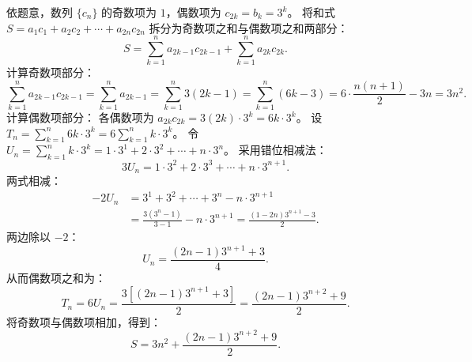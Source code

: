 \begin{answer}
依题意，数列 $\{c_n\}$ 的奇数项为 $1$，偶数项为 $c_{2k} = b_k = 3^k$。
将和式 $S = a_1 c_1 + a_2 c_2 + \cdots + a_{2n} c_{2n}$ 拆分为奇数项之和与偶数项之和两部分：
\nopagebreak[4]
\[S = \sum_{k=1}^n a_{2k-1} c_{2k-1} + \sum_{k=1}^n a_{2k} c_{2k}.\]
计算奇数项部分：
\nopagebreak[4]
\[\sum_{k=1}^n a_{2k-1} c_{2k-1} = \sum_{k=1}^n a_{2k-1} = \sum_{k=1}^n 3(2k - 1) = \sum_{k=1}^n (6k - 3) = 6 \cdot \frac{n(n + 1)}{2} - 3n = 3n^2.\]
计算偶数项部分：
各偶数项为 $a_{2k} c_{2k} = 3(2k) \cdot 3^k = 6k \cdot 3^k$。
设 $T_n = \sum_{k=1}^n 6k \cdot 3^k = 6 \sum_{k=1}^n k \cdot 3^k$。
令 $U_n = \sum_{k=1}^n k \cdot 3^k = 1 \cdot 3^1 + 2 \cdot 3^2 + \cdots + n \cdot 3^n$。
采用错位相减法：
\nopagebreak[4]
\[3 U_n = 1 \cdot 3^2 + 2 \cdot 3^3 + \cdots + n \cdot 3^{n+1}.\]
两式相减：
\nopagebreak[4]
\[\begin{aligned}
-2 U_n &= 3^1 + 3^2 + \cdots + 3^n - n \cdot 3^{n+1} \\
&= \frac{3(3^n - 1)}{3 - 1} - n \cdot 3^{n+1} = \frac{(1 - 2n)3^{n+1} - 3}{2}.
\end{aligned}\]
两边除以 $-2$：
\nopagebreak[4]
\[U_n = \frac{(2n - 1)3^{n+1} + 3}{4}.\]
从而偶数项之和为：
\nopagebreak[4]
\[T_n = 6 U_n = \frac{3[(2n - 1)3^{n+1} + 3]}{2} = \frac{(2n - 1)3^{n+2} + 9}{2}.\]
将奇数项与偶数项相加，得到：
\nopagebreak[4]
\[S = 3n^2 + \frac{(2n - 1)3^{n+2} + 9}{2}.\]



\end{answer}
